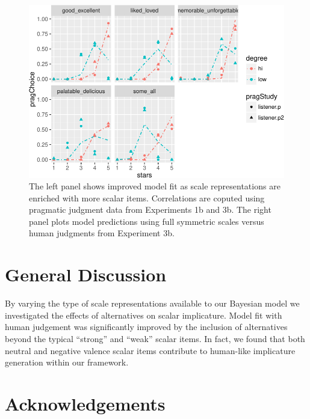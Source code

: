 \documentclass[10pt, letterpaper]{article}
\newenvironment{CodeChunk}{}{}
\begin{document}
\begin{CodeChunk}
\begin{figure}[t]

{\centering \includegraphics{figs/performancePlots-1} 

}

\caption[The left panel shows improved model fit as scale representations are enriched with more scalar items]{The left panel shows improved model fit as scale representations are enriched with more scalar items. Correlations are coputed using pragmatic judgment data from Experiments 1b and 3b. The right panel plots model predictions using full symmetric scales versus human judgments from Experiment 3b.}\label{fig:performancePlots}
\end{figure}
\end{CodeChunk}

\section{General Discussion}\label{general-discussion}

By varying the type of scale representations available to our Bayesian
model we investigated the effects of alternatives on scalar implicature.
Model fit with human judgement was significantly improved by the
inclusion of alternatives beyond the typical ``strong'' and ``weak''
scalar items. In fact, we found that both neutral and negative valence
scalar items contribute to human-like implicature generation within our
framework.

\section{Acknowledgements}\label{acknowledgements}
\end{document}
